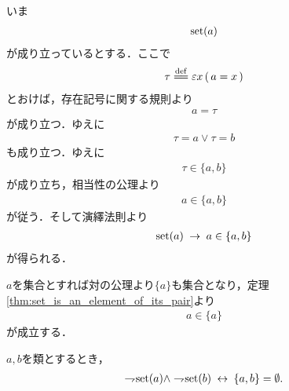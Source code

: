 	\begin{sketch}
		いま
		\begin{align}
			\operatorname*{set} (a)
		\end{align}
		が成り立っているとする．ここで
		\begin{align}
			\tau \defeq \varepsilon x\, (\, a = x\, )
		\end{align}
		とおけば，存在記号に関する規則より
		\begin{align}
			a = \tau
		\end{align}
		が成り立つ．ゆえに
		\begin{align}
			\tau = a \vee \tau = b
		\end{align}
		も成り立つ．ゆえに
		\begin{align}
			\tau \in \{a,b\}
		\end{align}
		が成り立ち，相当性の公理より
		\begin{align}
			a \in \{a,b\}
		\end{align}
		が従う．そして演繹法則より\
		\begin{align}
			\operatorname*{set} (a) \hspace{0.25em}\rightarrow\hspace{0.25em} a \in \{a,b\}
		\end{align}
		が得られる．
		\QED
	\end{sketch}
	
	$a$を集合とすれば対の公理より$\{a\}$も集合となり，定理\ref{thm:set_is_an_element_of_its_pair}より
	\begin{align}
		a \in \{a\}
	\end{align}
	が成立する．
	
	\begin{screen}
		\begin{thm}[真類同士の対は空]\label{thm:pair_of_proper_classes_is_emptyset}
			$a,b$を類とするとき，
			\begin{align}
				\rightharpoondown\hspace{-0.25em} \operatorname*{set} (a) \wedge \rightharpoondown\hspace{-0.25em} \operatorname*{set} (b) \hspace{0.25em}\leftrightarrow\hspace{0.25em} \{a,b\} = \emptyset.
			\end{align}
		\end{thm}
	\end{screen}
	
